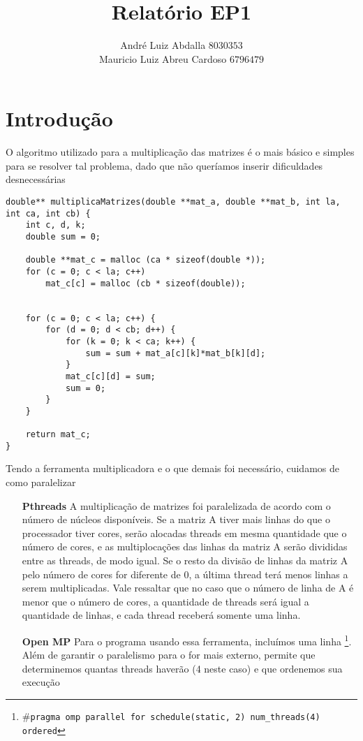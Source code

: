 \documentclass[11pt]{article}
\author{André Luiz Abdalla $8030353$ \\ Mauricio Luiz Abreu Cardoso $6796479$}
\title{Relatório EP1}
\begin{document}
    \maketitle

    \section{Introdução}

    O algoritmo utilizado para a multiplicação das matrizes é o mais básico e simples para se resolver tal problema,
    dado que não queríamos inserir dificuldades desnecessárias

    \begin{lstlisting}[caption=Função para multiplicar matrizes]
double** multiplicaMatrizes(double **mat_a, double **mat_b, int la, int ca, int cb) {
    int c, d, k;
    double sum = 0;

    double **mat_c = malloc (ca * sizeof(double *));
    for (c = 0; c < la; c++)
        mat_c[c] = malloc (cb * sizeof(double));


    for (c = 0; c < la; c++) {
        for (d = 0; d < cb; d++) {
            for (k = 0; k < ca; k++) {
                sum = sum + mat_a[c][k]*mat_b[k][d];
            }
            mat_c[c][d] = sum;
            sum = 0;
        }
    }

    return mat_c;
}
    \end{lstlisting}

    Tendo a ferramenta multiplicadora e o que demais foi necessário, cuidamos de como paralelizar \begin{itemize}
        \item[\textbf{Pthreads}] A multiplicação de matrizes foi paralelizada de acordo com o número de núcleos disponíveis. Se a matriz A tiver mais linhas do que o processador tiver cores, serão alocadas threads em mesma quantidade que o número de cores, e as multiplocações das linhas da matriz A serão divididas entre as threads, de modo igual. Se o resto da divisão de linhas da matriz A pelo número de cores for diferente de 0, a última thread terá menos linhas a serem multiplicadas. Vale ressaltar que no caso que o número de linha de A é menor que o número de cores, a quantidade de threads será igual a quantidade de linhas, e cada thread receberá somente uma linha.
        \item[\textbf{Open MP}] Para o programa usando essa ferramenta, incluímos uma linha
        \footnote{\texttt{$\#$pragma omp parallel for schedule(static, 2) num\_threads(4) ordered}}. Além de garantir o
        paralelismo para o for mais externo, permite que determinemos quantas threads haverão (4 neste caso) e que ordenemos sua execução
    \end{itemize}
\end{document}
